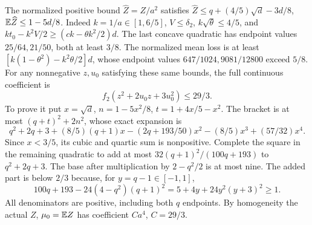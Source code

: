 The normalized positive bound $\widehat Z=Z/a^2$ satisfies
$\widehat Z\le q+(4/5)\sqrt d-3d/8$,
$\mathbb E\widehat Z\le1-5d/8$.
Indeed $k=1/a\in[1,6/5]$, $V\le\delta_2$,
$k\sqrt\theta\le4/5$, and
$kt_0-k^2V/2\ge(ck-\theta k^2/2)d$.
The last concave quadratic has endpoint values $25/64,21/50$,
both at least $3/8$.
The normalized mean loss is at least
$[k(1-\theta^2)-k^2\theta/2]d$, whose endpoint values
$647/1024,9081/12800$ exceed $5/8$.
For any nonnegative $z,u_0$ satisfying these same bounds, the full
continuous coefficient is
\begin{equation}\tag{L38.3.3}\label{eq:L38:curvature}
f_2(z^2+2u_0z+3u_0^2)\le29/3.
\end{equation}
To prove it put $x=\sqrt d$, $n=1-5x^2/8$,
$t=1+4x/5-x^2$. The bracket is at most
$(q+t)^2+2n^2$, whose exact expansion is
\[
q^2+2q+3+(8/5)(q+1)x-(2q+193/50)x^2
-(8/5)x^3+(57/32)x^4.
\]
Since $x<3/5$, its cubic and quartic sum is nonpositive.
Complete the square in the remaining quadratic to add at most
$32(q+1)^2/(100q+193)$ to $q^2+2q+3$.
The base after multiplication by $2-q^2/2$ is at most nine.
The added part is below $2/3$ because, for $y=q-1\in[-1,1]$,
\[
100q+193-24(4-q^2)(q+1)^2
=5+4y+24y^2(y+3)^2\ge1.
\]
All denominators are positive, including both $q$ endpoints.
By homogeneity the actual $Z$, $\mu_0=\mathbb E Z$ has coefficient
$Ca^4$, $C=29/3$.

